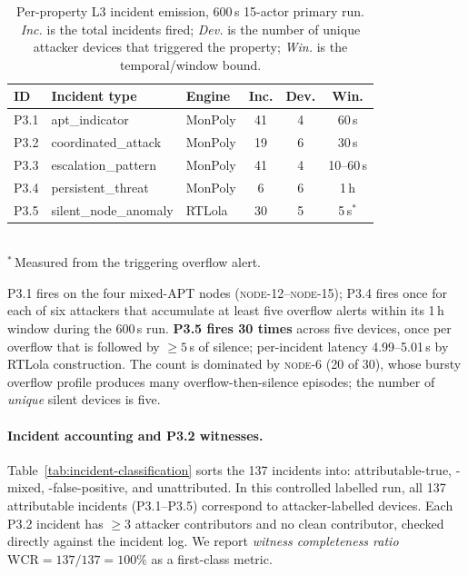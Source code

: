 \documentclass[runningheads]{llncs}
\begin{document}
\begin{table}[t]
\centering
\caption{Per-property L3 incident emission, 600\,s 15-actor
primary run.  \emph{Inc.} is the total incidents fired;
\emph{Dev.} is the number of unique attacker devices that
triggered the property; \emph{Win.} is the temporal/window bound.}
\label{tab:l3-detection}
\renewcommand{\arraystretch}{1.1}
\setlength{\tabcolsep}{5pt}
\footnotesize
\begin{tabular}{@{}l l l c c c@{}}
\toprule
\textbf{ID} & \textbf{Incident type} & \textbf{Engine} & \textbf{Inc.} & \textbf{Dev.} & \textbf{Win.} \\
\midrule
P3.1 & \textsf{apt\_indicator}      & MonPoly & 41 & 4  & 60\,s     \\
P3.2 & \textsf{coordinated\_attack} & MonPoly & 19  & 6 & 30\,s \\
P3.3 & \textsf{escalation\_pattern} & MonPoly & 41 & 4  & 10--60\,s \\
P3.4 & \textsf{persistent\_threat}  & MonPoly &  6 & 6   & 1\,h      \\
P3.5 & \textsf{silent\_node\_anomaly} & RTLola & 30  & 5  & 5\,s$^{*}$ \\
\bottomrule
\end{tabular}
\\[2pt]
{\footnotesize $^{*}$\,Measured from the triggering overflow alert.}
\end{table}

P3.1 fires on the four mixed-APT nodes (\textsc{node-12}--\textsc{node-15}); P3.4 fires once for each of six attackers that accumulate at least five overflow alerts within its 1\,h window during the 600\,s run. \textbf{P3.5 fires 30 times} across five devices, once per overflow
that is followed by $\geq 5$\,s of silence; per-incident latency 4.99--5.01\,s by RTLola construction. The count is dominated by
\textsc{node-6} (20 of 30), whose bursty overflow profile produces many overflow-then-silence episodes; the number of \emph{unique} silent devices is five.


\paragraph{Incident accounting and P3.2 witnesses.}
Table~\ref{tab:incident-classification} sorts the 137 incidents
into: attributable-true, -mixed, -false-positive, and unattributed.  In this controlled labelled run, all 137 attributable incidents (P3.1--P3.5) correspond to attacker-labelled devices.  Each P3.2 incident has $\geq 3$ attacker contributors and no clean contributor, checked directly against the incident log. We report \emph{witness completeness ratio}
$\mathrm{WCR}=137/137 = 100\%$ as a first-class metric.
\end{document}
